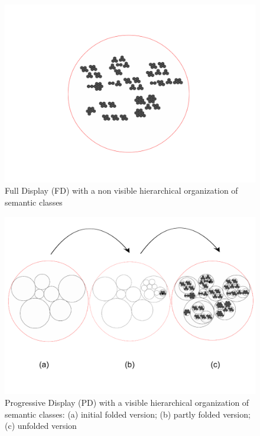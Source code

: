 \documentclass{aes2e}
\begin{document}
\begin{figure}[t!]
\begin{center}
\includegraphics[scale=0.30]{gfx/XP2clean.pdf} 
\end{center}
\caption{\label{figXP2} Full Display (FD) with a non visible hierarchical organization of semantic classes }
\end{figure}

\begin{figure}[t]
\begin{center}
\includegraphics[scale=0.4]{gfx/XP1clean2.pdf} 
\end{center}
\caption{\label{figXP1} Progressive Display (PD) with a  visible hierarchical organization of semantic classes: (a) initial folded version; (b) partly folded version; (c) unfolded version}
\end{figure}
\end{document}
